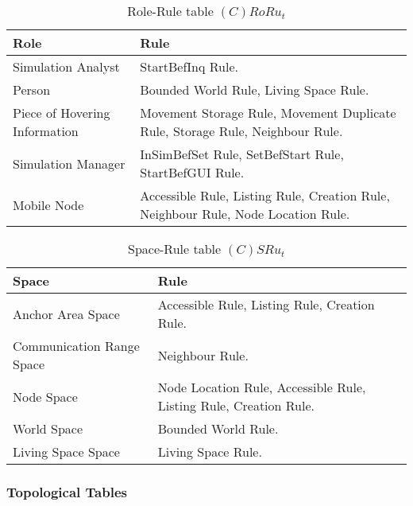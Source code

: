 \begin{table}[H]
	\centering
	\begin{tabular}{|p{4cm}|p{8cm}|}
			\hline
			\textbf{Role} & \textbf{Rule} \\
			\hline
			Simulation Analyst & StartBefInq Rule. \\
			\hline
			Person & Bounded World Rule, Living Space Rule. \\
			\hline
			Piece of Hovering Information & Movement Storage Rule, Movement Duplicate
			Rule, Storage Rule, Neighbour Rule. \\
			\hline
			Simulation Manager & InSimBefSet Rule, SetBefStart Rule, StartBefGUI Rule. \\
			\hline
			Mobile Node & Accessible Rule, Listing Rule, Creation Rule, Neighbour
			Rule, Node Location Rule. \\
			\hline
		\end{tabular}
	\caption{Role-Rule table $(C)RoRu_t$}
	\label{tab:crorut}
\end{table}

\begin{table}[H]
	\centering
	\begin{tabular}{|p{4cm}|p{8cm}|}
			\hline
			\textbf{Space} & \textbf{Rule} \\
			\hline
			Anchor Area Space & Accessible Rule, Listing Rule, Creation Rule. \\
			\hline
			Communication Range Space & Neighbour Rule. \\
			\hline
			Node Space & Node Location Rule, Accessible Rule, Listing Rule, Creation Rule. \\
			\hline
			World Space & Bounded World Rule. \\
			\hline
			Living Space Space & Living Space Rule. \\
			\hline
		\end{tabular}
	\caption{Space-Rule table $(C)SRu_t$}
	\label{tab:cot}
\end{table}

\subsubsection{Topological Tables}

